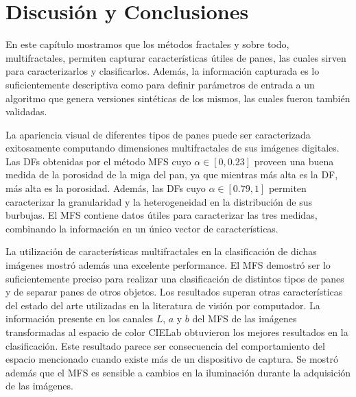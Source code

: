 


\section{Discusión y Conclusiones}

En este capítulo mostramos que los métodos fractales y sobre todo, multifractales, permiten capturar características útiles de panes, las cuales sirven para caracterizarlos y clasificarlos.
Además, la información capturada es lo suficientemente descriptiva como para definir parámetros de entrada a un algoritmo que genera versiones sintéticas de los mismos, las cuales fueron también validadas.


La apariencia visual de diferentes tipos de panes puede ser caracterizada exitosamente computando dimensiones multifractales de sus imágenes digitales.
Las DFs obtenidas por el método MFS cuyo $\alpha \in [0,0.23]$ proveen una buena medida de la porosidad de la miga del pan, ya que mientras más alta es la DF, más alta es la porosidad.
Además, las DFs cuyo $\alpha \in [0.79,1]$ permiten caracterizar la granularidad y la heterogeneidad en la distribución de sus burbujas.
El MFS contiene datos útiles para caracterizar las tres medidas, combinando la información en un único vector de características.

La utilización de características multifractales en la clasificación de dichas imágenes mostró además una excelente performance.
El MFS demostró ser lo suficientemente preciso para realizar una clasificación de distintos tipos de panes y de separar panes de otros objetos.
Los resultados superan otras características del estado del arte utilizadas en la literatura de visión por computador.
La información presente en los canales $L$, $a$ y $b$ del MFS de las imágenes transformadas al espacio de color CIELab obtuvieron los mejores resultados en la clasificación.
Este resultado parece ser consecuencia del comportamiento del espacio mencionado cuando existe más de un dispositivo de captura.
Se mostró además que el MFS es sensible a cambios en la iluminación durante la adquisición de las imágenes.

